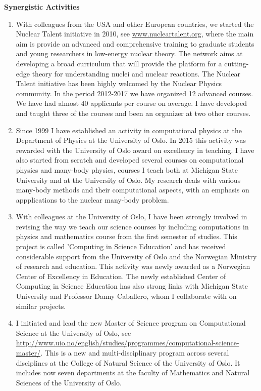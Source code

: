 \documentclass[10pt,a4wide]{revtex4-1}
\begin{document}
\noindent
{\bf Synergistic Activities}
\vspace*{-8pt}

\begin{enumerate}
\item With colleagues from the USA and other European countries, we started the Nuclear Talent initiative in 2010,
see \url{www.nucleartalent.org}, where the main aim is  provide an advanced
and comprehensive training to graduate students and young researchers
in low-energy nuclear theory. The network aims at developing a broad
curriculum that will provide the platform for a cutting-edge theory
for understanding nuclei and nuclear reactions.  The Nuclear Talent initiative has been highly welcomed by the Nuclear Physics community.
In the period 2012-2017 we have organized 12 advanced courses. We have had almost 40 applicants per course on average. I have developed and taught three of the courses and been an organizer at two other courses.

\item Since 1999
I have   established an activity in computational physics  at the 
Department of Physics at the University
of Oslo. In 2015 this activity was rewarded with the University of Oslo award on excellency in teaching. I have also started from scratch and developed several  courses on computational physics and many-body physics, courses I teach both at Michigan State University and at the University of Oslo. My research deals with various many-body methods and their computational aspects, with an emphasis on appplications to the nuclear many-body problem.


\item With colleagues at the University of Oslo, I have  
been strongly involved in revising the way we teach our  science courses by including computations in physics and mathematics course from the first semester of studies.
This project is called 'Computing in Science Education' 
and has received considerable support
from the University of Oslo and the Norwegian Ministry of research and education.   This activity was newly awarded as a Norwegian Center of Excellency in Education. The newly established Center of Computing in Science Education has also strong links with Michigan State University and Professor Danny Caballero, whom I collaborate with on similar projects. 

\item I initiated and lead the new Master of Science program on Computational Science at the University of Oslo, see \url{http://www.uio.no/english/studies/programmes/computational-science-master/}. This is a new and multi-disciplinary program across several disciplines at the College of Natural Science of the University of Oslo. It includes now seven departments at the faculty of Mathematics and Natural Sciences of the University of Oslo.

\end{enumerate}
\end{document}
